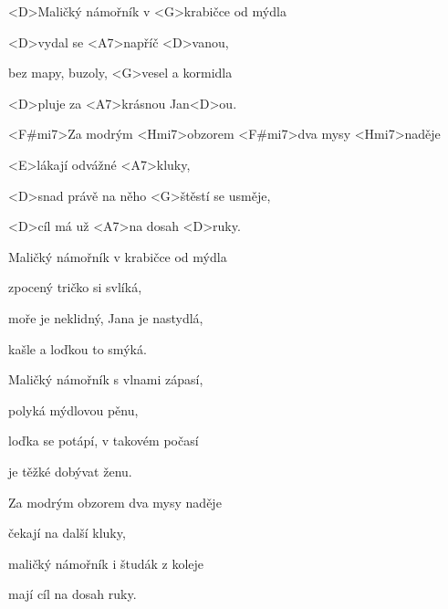

\zs
<D>Maličký námořník v <G>krabičce od mýdla

<D>vydal se <A7>napříč <D>vanou,

bez mapy, buzoly, <G>vesel a kormidla

<D>pluje za <A7>krásnou Jan<D>ou.
\ks

\zr
<F#mi7>Za modrým <Hmi7>obzorem
<F#mi7>dva mysy <Hmi7>naděje

<E>lákají odvážné <A7>kluky,

<D>snad právě na něho <G>štěstí se usměje,

<D>cíl má už <A7>na dosah <D>ruky.
\kr

\zs
Maličký námořník v krabičce od mýdla

zpocený tričko si svlíká,

moře je neklidný, Jana je nastydlá,

kašle a loďkou to smýká.
\ks

\zr \kr


\zs
Maličký námořník s vlnami zápasí,

polyká mýdlovou pěnu,

loďka se potápí, v takovém počasí

je těžké dobývat ženu.
\ks

\zr

Za modrým obzorem dva mysy naděje

čekají na další kluky,

maličký námořník i študák z koleje

mají cíl na dosah ruky.
\kr

\kp
